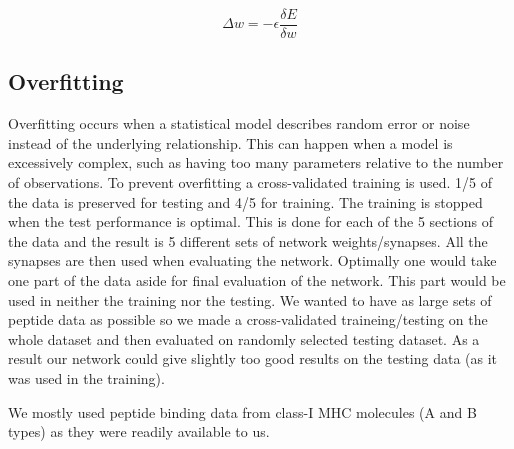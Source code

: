 \begin{equation}
\Delta w = -\epsilon \frac{\delta E}{\delta w}
\end{equation}

\subsection{Overfitting}
Overfitting occurs when a statistical model describes random error or noise instead of the underlying relationship.
This can happen when a model is excessively complex, such as having too many parameters relative to the number of observations.
To prevent overfitting a cross-validated training is used. 1/5 of the data is preserved for testing and 4/5 for training. 
The training is stopped when the test performance is optimal. This is done for each of the 5 sections of the data and the result is 5 different sets of network weights/synapses.
All the synapses are then used when evaluating the network.
Optimally one would take one part of the data aside for final evaluation of the network. This part would be used in neither the training nor the testing.
We wanted to have as large sets of peptide data as possible so we made a cross-validated traineing/testing on the whole dataset and then evaluated on randomly selected testing dataset.
As a result our network could give slightly too good results on the testing data (as it was used in the training).

We mostly used peptide binding data from class-I MHC molecules (A and B types) as they were readily available to us.


